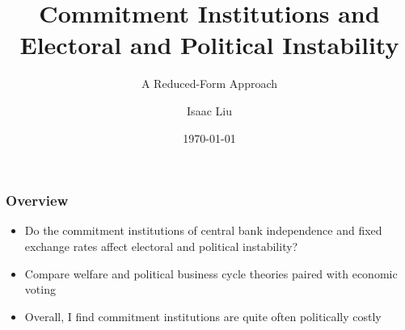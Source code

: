 \documentclass{beamer}
\title[Commitment Institutions and Instability]{Commitment Institutions and Electoral and Political Instability}
\subtitle{A Reduced-Form Approach}
\author{Isaac Liu}
\date{\today}
\begin{document}
    \begin{frame}
        \titlepage
    \end{frame}

    \begin{frame}
        \frametitle{Overview}
        \begin{itemize}
            \item Do the commitment institutions of central bank independence and fixed exchange rates affect electoral and political instability?
            \item Compare welfare and political business cycle theories paired with economic voting
            \item Overall, I find commitment institutions are quite often politically costly
        \end{itemize}
    \end{frame}
\end{document}
